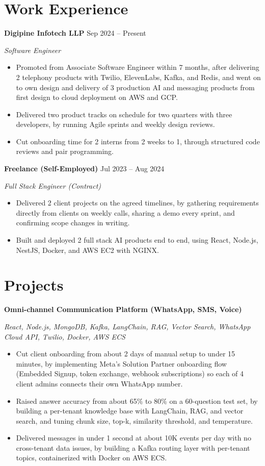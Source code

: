 \documentclass[a4paper,10pt]{article}
\newcommand{\company}[2]{\textbf{#1} \hfill #2\par}
\newcommand{\position}[2]{\textit{#1} \hfill \textit{#2}\par\vspace{1pt}}
\newcommand{\project}[2]{\vspace{2pt}\textbf{#1}\par\textit{#2}\par\vspace{1pt}}
\begin{document}
\section{Work Experience}
\company{Digipine Infotech LLP}{Sep 2024 -- Present}
\position{Software Engineer}{}
\begin{itemize}
  \item Promoted from Associate Software Engineer within 7 months, after delivering 2 telephony products with Twilio, ElevenLabs, Kafka, and Redis, and went on to own design and delivery of 3 production AI and messaging products from first design to cloud deployment on AWS and GCP.
  \item Delivered two product tracks on schedule for two quarters with three developers, by running Agile sprints and weekly design reviews.
  \item Cut onboarding time for 2 interns from 2 weeks to 1, through structured code reviews and pair programming.
\end{itemize}

\vspace{3pt}
\company{Freelance (Self-Employed)}{Jul 2023 -- Aug 2024}
\position{Full Stack Engineer (Contract)}{}
\begin{itemize}
  \item Delivered 2 client projects on the agreed timelines, by gathering requirements directly from clients on weekly calls, sharing a demo every sprint, and confirming scope changes in writing.
  \item Built and deployed 2 full stack AI products end to end, using React, Node.js, NestJS, Docker, and AWS EC2 with NGINX.
\end{itemize}

\section{Projects}
\project{Omni-channel Communication Platform (WhatsApp, SMS, Voice)}{React, Node.js, MongoDB, Kafka, LangChain, RAG, Vector Search, WhatsApp Cloud API, Twilio, Docker, AWS ECS}
\begin{itemize}
  \item Cut client onboarding from about 2 days of manual setup to under 15 minutes, by implementing Meta's Solution Partner onboarding flow (Embedded Signup, token exchange, webhook subscriptions) so each of 4 client admins connects their own WhatsApp number.
  \item Raised answer accuracy from about 65\% to 80\% on a 60-question test set, by building a per-tenant knowledge base with LangChain, RAG, and vector search, and tuning chunk size, top-k, similarity threshold, and temperature.
  \item Delivered messages in under 1 second at about 10K events per day with no cross-tenant data issues, by building a Kafka routing layer with per-tenant topics, containerized with Docker on AWS ECS.
\end{itemize}
\end{document}
